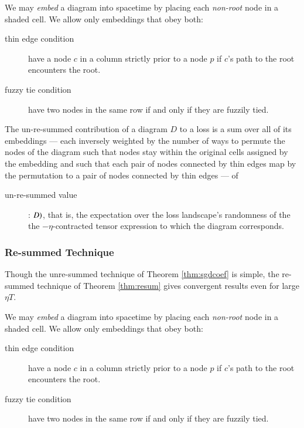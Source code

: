 \documentclass{article}
\theoremstyle{plain}
\theoremstyle{definition}
\begin{document}
            We may \emph{embed} a diagram into spacetime by placing each
            \emph{non-root} node in a shaded cell.  We allow only embeddings
            that obey both:
            \begin{description}
                \item[thin edge condition] have a node $c$ in a column strictly
                    prior to a node $p$ if $c$'s path to the root encounters
                    the root.
                \item[fuzzy tie condition] have two nodes in the same row if
                    and only if they are fuzzily tied.
            \end{description}

            The un-re-summed contribution of a diagram $D$ to a loss is a
            sum over all of its embeddings --- each inversely weighted by the
            number of ways to permute the nodes of the diagram such that nodes
            stay within the original cells assigned by the embedding and such
            that each pair of nodes connected by thin edges map by the
            permutation to a pair of nodes connected by thin edges --- of
            \begin{description}
                \item[un-re-summed value]: $\value(D)$, that is, the
                    expectation over the loss landscape's randomness of the
                    the $-\eta$-contracted tensor expression to which the
                    diagram corresponds.
            \end{description}

        \subsubsection*{Re-summed Technique} 
            Though the unre-summed technique of Theorem \ref{thm:sgdcoef} is
            simple, the re-summed technique of Theorem \ref{thm:resum}
            gives convergent results even for large $\eta T$.

            We may \emph{embed} a diagram into spacetime by placing each
            \emph{non-root} node in a shaded cell.  We allow only embeddings
            that obey both:
            \begin{description}
                \item[thin edge condition] have a node $c$ in a column strictly
                    prior to a node $p$ if $c$'s path to the root encounters
                    the root.
                \item[fuzzy tie condition] have two nodes in the same row if
                    and only if they are fuzzily tied.
            \end{description}
\end{document}

